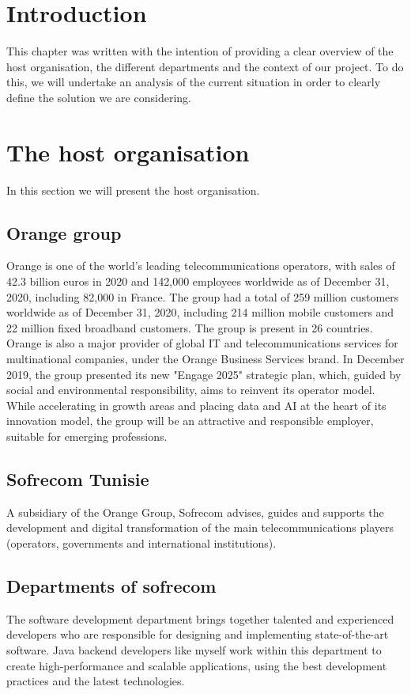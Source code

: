
\section{Introduction}
This chapter was written with the intention of providing a clear overview of the host organisation, the different departments and the context of our project.
To do this, we will undertake an analysis of the current situation in order to clearly define the solution we are considering.
\section{The host organisation}
In this section we will present the host organisation.
\subsection{Orange group}
Orange is one of the world's leading telecommunications operators, with sales of 42.3 billion euros in 2020 and 142,000 employees worldwide as of December 31, 2020, including 82,000 in France. The group had a total of 259 million customers worldwide as of December 31, 2020, including 214 million mobile customers and 22 million fixed broadband customers. The group is present in 26 countries. Orange is also a major provider of global IT and telecommunications services for multinational companies, under the Orange Business Services brand. In December 2019, the group presented its new "Engage 2025" strategic plan, which, guided by social and environmental responsibility, aims to reinvent its operator model. While accelerating in growth areas and placing data and AI at the heart of its innovation model, the group will be an attractive and responsible employer, suitable for emerging professions.
\subsection{Sofrecom Tunisie}
A subsidiary of the Orange Group, Sofrecom advises, guides and supports the development and digital transformation of the main telecommunications players (operators, governments and international institutions).

\subsection{Departments of sofrecom}
The software development department brings together talented and experienced developers who are responsible for designing and implementing state-of-the-art software. Java backend developers like myself work within this department to create high-performance and scalable applications, using the best development practices and the latest technologies.

